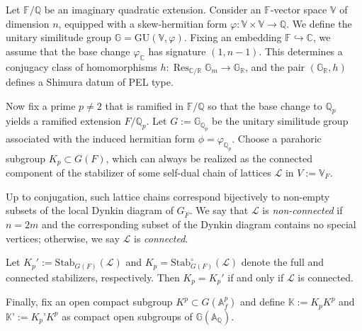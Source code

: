 \documentclass[pdflatex,sn-mathphys-num]{sn-jnl}%
\theoremstyle{thmstyleone}%
\theoremstyle{thmstyletwo}%
\numberwithin{equation}{subsection}
\theoremstyle{thmstylethree}%
\newcommand{\BA}{\ensuremath{\mathbb{A}}\xspace}
\newcommand{\BC}{\ensuremath{\mathbb{C}}\xspace}
\newcommand{\BF}{\ensuremath{\mathbb{F}}\xspace}
\newcommand{\BG}{\ensuremath{\mathbb{G}}\xspace}
\newcommand{\BK}{\ensuremath{\mathbb{K}}\xspace}
\newcommand{\BQ}{\ensuremath{\mathbb{Q}}\xspace}
\newcommand{\BR}{\ensuremath{\mathbb{R}}\xspace}
\newcommand{\BV}{\ensuremath{\mathbb{V}}\xspace}
\newcommand{\CL}{\ensuremath{\mathcal{L}}\xspace}
\newcommand{\GU}{\mathrm{GU}}
\DeclareMathOperator{\Res}{Res}
\begin{document}
Let $\BF\slash\BQ$ be an imaginary quadratic extension. Consider an $\BF$-vector space $\BV$ of dimension $n$, equipped with a skew-hermitian form $\varphi:\BV\times \BV\rightarrow \BQ$. 
We define the unitary similitude group $\BG = \GU(\BV, \varphi)$. Fixing an embedding $\BF \hookrightarrow \BC$, we assume that the base change $\varphi_\BC$ has signature $(1, n-1)$. This determines a conjugacy class of homomorphisms $h : \Res_{\BC/\BR} \BG_m \rightarrow \BG_\BR$, and the pair $(\BG_\BR, h)$ defines a Shimura datum of PEL type.
		
Now fix a prime $p\neq 2$ that is ramified in $\BF/\BQ$ so that the base change to $\BQ_p$ yields a ramified extension $F/\BQ_p$.
Let $G:=\BG_{\BQ_p}$ be the unitary similitude group associated with the induced hermitian form $\phi=\varphi_{\BQ_p}$. Choose a parahoric subgroup $K_p\subset G(F)$, which can always be realized as the connected component of the stabilizer of some self-dual chain of lattices $\CL$ in $V:=\BV_F$.

Up to conjugation, such lattice chains correspond bijectively to non-empty subsets of the local Dynkin diagram of $G_{\breve{F}}$. We say that $\CL$ is \emph{non-connected} if $n = 2m$ and the corresponding subset of the Dynkin diagram contains no special vertices; otherwise, we say $\CL$ is \emph{connected}.

Let $K_p':=\text{Stab}_{G(F)}(\CL)$ and $K_p=\text{Stab}^\circ_{G(F)}(\CL)$ denote the full and connected stabilizers, respectively. Then $K_p=K_p'$ if and only if $\CL$ is connected.

Finally, fix an open compact subgroup $K^p \subset G(\BA^p_f)$ and define $\BK := K_p K^p$ and $\BK’ := K_p’ K^p$ as compact open subgroups of $\BG(\BA_\BQ)$.
		
\end{document}
